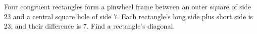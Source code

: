 Four congruent rectangles form a pinwheel frame between an outer square of side $23$ and a central square hole of side $7$. Each rectangle's long side plus short side is $23$, and their difference is $7$. Find a rectangle's diagonal.
